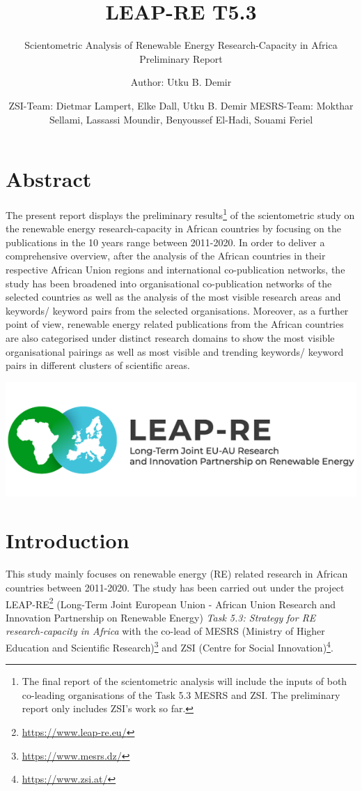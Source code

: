 \documentclass[
]{book}
\title{LEAP-RE T5.3}
\subtitle{Scientometric Analysis of Renewable Energy Research-Capacity in Africa \textbar{} Preliminary Report}
\author{Author: Utku B. Demir}
\date{ZSI-Team: Dietmar Lampert, Elke Dall, Utku B. Demir \textbar{} MESRS-Team: Mokthar Sellami, Lassassi Moundir, Benyoussef El-Hadi, Souami Feriel}
\renewcommand{\href}[2]{#2\footnote{\url{#1}}}
\begin{document}
\maketitle

{
\setcounter{tocdepth}{1}
\tableofcontents
}
\hypertarget{abstract}{%
\chapter*{Abstract}\label{abstract}}

The present report displays the preliminary results\footnote{The final report of the scientometric analysis will include the inputs of both co-leading organisations of the Task 5.3 MESRS and ZSI. The preliminary report only includes ZSI's work so far.} of the scientometric study on the renewable energy
research-capacity in African countries by focusing on the publications in the 10 years range between 2011-2020. In order to deliver a comprehensive overview, after the analysis of the African countries in their respective African Union regions and international co-publication networks, the study has been broadened into organisational co-publication networks of the selected countries as well as the analysis of the most visible research areas and keywords/ keyword pairs from the selected organisations. Moreover, as a further point of view, renewable energy related publications from the African countries are also categorised under distinct research domains to show the most visible organisational pairings as well as most visible and trending keywords/ keyword pairs in different clusters of scientific areas.

\includegraphics[width=1\linewidth]{./leapre}

\hypertarget{intro}{%
\chapter{Introduction}\label{intro}}

This study mainly focuses on renewable energy (RE) related research in African countries between 2011-2020. The study has been carried out under the project \href{https://www.leap-re.eu/}{LEAP-RE} (Long-Term Joint European Union - African Union Research and Innovation Partnership on Renewable Energy) \emph{Task 5.3: Strategy for RE research-capacity in Africa} with the co-lead of \href{https://www.mesrs.dz/}{MESRS (Ministry of Higher Education and Scientific Research)} and \href{https://www.zsi.at/}{ZSI (Centre for Social Innovation)}.
\end{document}
